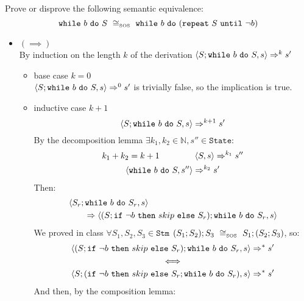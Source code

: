 \begin{exercise}{
    Prove or disprove the following semantic equivalence:
    \[ \wwhile{b}{S}\ \cong_{\text{\tiny SOS}}\ \wwhile{b}{(\wrepeat{S}{\neg b})}  \]
}
\begin{itemize}
\begin{itemize}
                \item $(\implies)$ \vspace{0.2cm} \\
                    By induction on the length $k$ of the derivation $\left<S;\texttt{while}\ b\ \texttt{do}\ S, s\right> \Rightarrow^k s'$
                    \begin{itemize}
                        \item base case $k=0$ \\
                            $\left<S;\texttt{while}\ b\ \texttt{do}\ S, s\right> \Rightarrow^0 s'$ is trivially false, so the implication is true.
                        \item inductive case $k+1$ \vspace*{-0.3cm}
                            \[ \left<S;\texttt{while}\ b\ \texttt{do}\ S, s\right> \Rightarrow^{k+1} s' \]
                            By the decomposition lemma $\exists k_1, k_2 \in \mathbb{N}, s'' \in \texttt{State} :$
                            \begin{gather*}
                                k_1 + k_2 = k + 1\qquad\qquad \left<S, s\right> \Rightarrow^{k_1} s'' \\
                                \left<\texttt{while}\ b\ \texttt{do}\ S, s''\right> \Rightarrow^{k_2} s'
                            \end{gather*}
                            Then:
                            \begin{align*}
                                &\left<S_r; \texttt{while}\ b\ \texttt{do}\ S_r, s\right>
                                \\&\qquad\Rightarrow \left<(S;\texttt{if}\ \neg b\ \texttt{then}\ skip\ \texttt{else}\ S_r); \texttt{while}\ b\ \texttt{do}\ S_r, s\right>
                            \end{align*}
                            We proved in class $\forall S_1, S_2, S_3 \in \texttt{Stm}$ $(S_1;S_2);S_3\ \cong_{\text{\tiny SOS}}\ S_1;(S_2;S_3)$, so:
                            \begin{gather*}
                                \left<(S;\texttt{if}\ \neg b\ \texttt{then}\ skip\ \texttt{else}\ S_r); \texttt{while}\ b\ \texttt{do}\ S_r, s\right> \Rightarrow^* s'
                                \\
                                \iff
                                \\
                                \left<S;(\texttt{if}\ \neg b\ \texttt{then}\ skip\ \texttt{else}\ S_r; \texttt{while}\ b\ \texttt{do}\ S_r), s\right> \Rightarrow^* s'
                            \end{gather*}
                            And then, by the composition lemma:
                            \begin{align*}

\end{align*}
\end{itemize}
\end{itemize}
\end{itemize}
\end{exercise}
